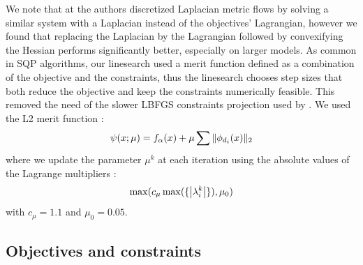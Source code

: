 We note that at \cite{rabi2018shape} the authors discretized Laplacian metric flows by solving a similar system with a Laplacian instead of the objectives' Lagrangian, however we found that replacing the Laplacian by the Lagrangian followed by convexifying the Hessian performs significantly better, especially on larger models. As common in SQP algorithms, our linesearch used a merit function defined as a combination of the objective and the constraints, thus the linesearch chooses step sizes that both reduce the objective and keep the constraints numerically feasible. This removed the need of the slower LBFGS constraints projection used by \cite{rabi18,rabi2018shape}. We used the L2 merit function \cite{nocedal}:
\begin{equation}
\psi(x;\mu) = f_\alpha(x)+\mu\sum\|\phi_{d_i}(x)\|_2
\end{equation}
where we update the parameter $\mu^k$ at each iteration using the absolute values of the Lagrange multipliers \cite{nocedal}:
\begin{equation}
\max(c_\mu \max(\{\left\vert\lambda_i^k\right\vert\}), \mu_0)	
\end{equation}
with $c_\mu = 1.1$ and $\mu_0 = 0.05$.

\subsection{Objectives and constraints} \label{sec:dog_obj}
